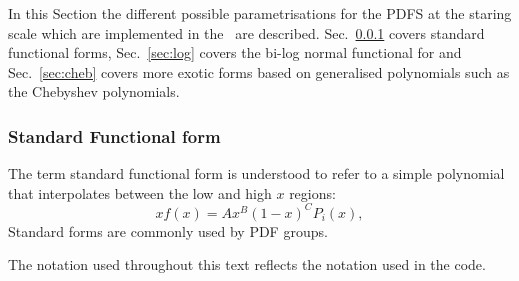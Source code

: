 
\label{sec:pdfparam}

In this Section the different possible parametrisations for the PDFS at the staring scale which are implemented in the \fitter\
are described. Sec.~\ref{sec:stdform} covers standard functional forms, Sec.~\ref{sec:log}  covers the bi-log normal functional 
for and Sec.~\ref{sec:cheb} covers more exotic forms based on generalised polynomials such as the Chebyshev polynomials.

\subsubsection{Standard Functional form}
\label{sec:stdform}
The term standard functional form is understood to refer to a simple polynomial 
that interpolates between the low and high $x$ regions:
\begin{equation}
 xf(x) = A x^{B} (1-x)^{C} P_i(x),
\label{eqn:pdf_std}
\end{equation}
Standard forms are commonly used by PDF groups.

The notation used throughout this text reflects the 
notation used in the code.

